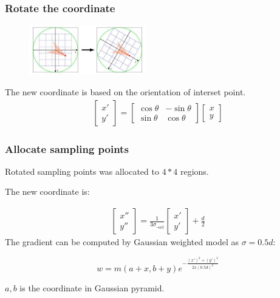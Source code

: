 \documentclass[notheorems, serif, table, compress]{beamer}  %
\begin{document}
\begin{frame}[fragile]
\frametitle{Rotate the coordinate}%
\begin{figure}
  \centering\includegraphics[width=2in]{zuobiaozhouxuanzhuan.png}
  \caption{}
 \label{zuobiaoxuanzhuan}
  \end{figure}

The new coordinate is based on the orientation of interset point.
\begin{gather*}
\begin{bmatrix}
x'\\
y'
\end{bmatrix}
=
\begin{bmatrix}
\cos\theta & -\sin\theta \\
\sin\theta & \cos\theta
\end{bmatrix}
\begin{bmatrix}
x\\
y
\end{bmatrix}
\end{gather*}

\end{frame}

\begin{frame}[fragile]
\frametitle{Allocate sampling points}%

Rotated sampling points was allocated to $4*4$ regions.

The new coordinate is:

\begin{gather*}
\begin{bmatrix}
x''\\
y''
\end{bmatrix}
=
\frac{1}{3\sigma\_ _{oct}}
\begin{bmatrix}
x'\\
y'
\end{bmatrix}
+\frac{d}{2}
\end{gather*}
The gradient can be computed by Gaussian weighted model as $\sigma=0.5d$:

\begin{equation}
w=m(a+x,b+y)e^{-\frac{(x')^{2}+(y')^{2}}{2x(0.5d)^{2}}}
\end{equation}

$a,b$ is the coordinate in Gaussian pyramid.
\end{frame}
\end{document}
